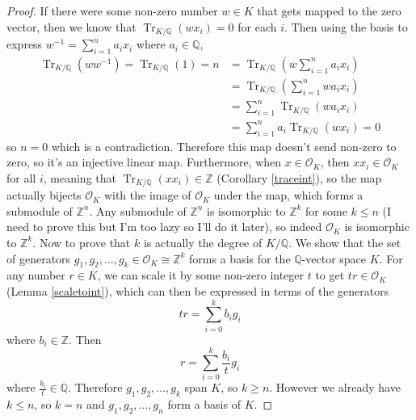 \documentclass{article}
\theoremstyle{definition}
\theoremstyle{definition}
\theoremstyle{definition}
\begin{document}
\begin{proof}
If there were some non-zero number $w\in K$ that gets mapped to the zero vector, then we know that $\operatorname{Tr}_{K/\mathbb Q}(wx_i)=0$ for each $i$. Then using the basis to express $w^{-1}=\sum_{i=1}^na_ix_i$ where $a_i\in\mathbb Q$,
\begin{align*}
\operatorname{Tr}_{K/\mathbb Q}(ww^{-1})=\operatorname{Tr}_{K/\mathbb Q}(1)=n&=\operatorname{Tr}_{K/\mathbb Q}\left(w\sum_{i=1}^na_ix_i\right)\\&=\operatorname{Tr}_{K/\mathbb Q}\left(\sum_{i=1}^nwa_ix_i\right)\\&=\sum_{i=1}^n\operatorname{Tr}_{K/\mathbb Q}(wa_ix_i)\\&=\sum_{i=1}^na_i\operatorname{Tr}_{K/\mathbb Q}(wx_i)=0
\end{align*}
so $n=0$ which is a contradiction. Therefore this map doesn't send non-zero to zero, so it's an injective linear map. Furthermore, when $x\in \mathcal O_K$, then $xx_i\in\mathcal O_K$ for all $i$, meaning that $\operatorname{Tr}_{K/\mathbb Q}(xx_i)\in\mathbb Z$ (Corollary \ref{traceint}), so the map actually bijects $\mathcal O_K$ with the image of $\mathcal O_K$ under the map, which forms a submodule of $\mathbb Z^n$. Any submodule of $\mathbb Z^n$ is isomorphic to $\mathbb Z^k$ for some $k\leq n$ (I need to prove this but I'm too lazy so I'll do it later), so indeed $\mathcal O_K$ is isomorphic to $\mathbb Z^k$.
\newline\newline
Now to prove that $k$ is actually the degree of $K/\mathbb Q$. We show that the set of generators $g_1,g_2,\dots,g_k\in\mathcal O_K\cong\mathbb Z^k$ forms a basis for the $\mathbb Q$-vector space $K$. For any number $r\in K$, we can scale it by some non-zero integer $t$ to get $tr\in\mathcal O_K$ (Lemma \ref{scaletoint}), which can then be expressed in terms of the generators
$$tr=\sum_{i=0}^kb_ig_i$$
where $b_i\in\mathbb Z$. Then
$$r=\sum_{i=0}^k\frac{b_i}{t}g_i$$
where $\frac{b_i}{t}\in\mathbb Q$. Therefore $g_1,g_2,\dots,g_k$ span $K$, so $k\geq n$. However we already have $k\leq n$, so $k=n$ and $g_1,g_2,\dots,g_n$ form a basis of $K$.
\end{proof}
\end{document}
